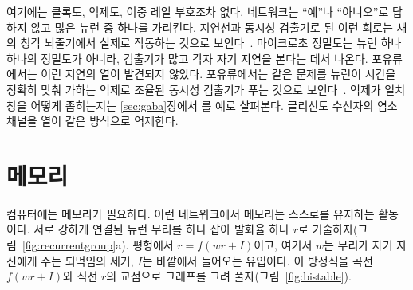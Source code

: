 여기에는 클록도, 억제도, 이중 레일 부호조차 없다. 네트워크는 “예”나 “아니오”로 답하지 않고 많은 뉴런 중 하나를 가리킨다. 지연선과 동시성 검출기로 된 이런 회로는 새의 청각 뇌줄기에서 실제로 작동하는 것으로 보인다~\cite{Carr1990}. 마이크로초 정밀도는 뉴런 하나하나의 정밀도가 아니라, 검출기가 많고 각자 자기 지연을 본다는 데서 나온다. 포유류에서는 이런 지연의 열이 발견되지 않았다. 포유류에서는 같은 문제를  뉴런이 시간을 정확히 맞춰 가하는 억제로 조율된 동시성 검출기가 푸는 것으로 보인다~\cite{Brand2002,Grothe2010}. 억제가 일치 창을 어떻게 좁히는지는 \ref{sec:gaba}장에서 를 예로 살펴본다. 글리신도 수신자의 염소 채널을 열어 같은 방식으로 억제한다.

\section{메모리}

컴퓨터에는 메모리가 필요하다. 이런 네트워크에서 메모리는 스스로를 유지하는 활동이다. 서로 강하게 연결된  뉴런 무리를 하나 잡아 발화율 하나 $r$로 기술하자(그림~\ref{fig:recurrentgroup}a). 평형에서 $r=f(wr+I)$이고, 여기서 $w$는 무리가 자기 자신에게 주는 되먹임의 세기, $I$는 바깥에서 들어오는 유입이다. 이 방정식을 곡선 $f(wr+I)$와 직선 $r$의 교점으로 그래프를 그려 풀자(그림~\ref{fig:bistable}).

